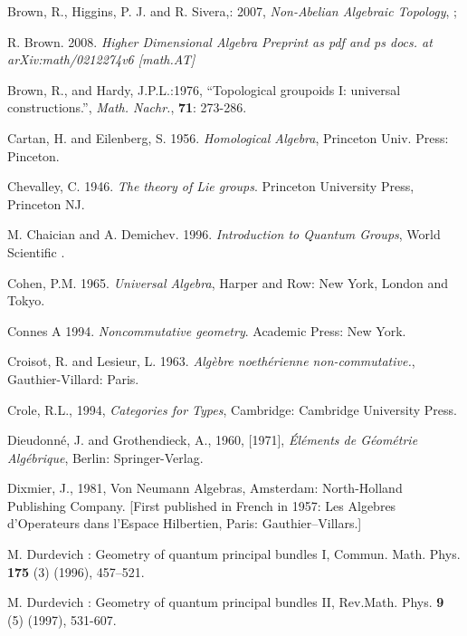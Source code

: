 \documentclass[12pt]{article}
\theoremstyle{plain}
\theoremstyle{definition}
\numberwithin{equation}{section}
\begin{document}
\begin{thebibliography}{199}

Brown, R., Higgins, P. J. and R. Sivera,: 2007, \emph{Non-Abelian Algebraic Topology}, 
;

R. Brown. 2008. {\em Higher Dimensional Algebra Preprint as pdf and ps docs. at arXiv:math/0212274v6 [math.AT]}

Brown, R., and Hardy, J.P.L.:1976, ``Topological groupoids I: universal constructions.'', \emph{Math. Nachr.}, \textbf{71}: 273-286.

Cartan, H. and Eilenberg, S. 1956. {\em Homological Algebra}, Princeton Univ. Press: Pinceton.

Chevalley, C. 1946. {\em The theory of Lie groups}. Princeton University Press, Princeton NJ.

M. Chaician and A. Demichev. 1996. {\em Introduction to Quantum Groups}, World Scientific .

Cohen, P.M. 1965. {\em Universal Algebra}, Harper and Row: New York, London and Tokyo.

Connes A 1994. \emph{Noncommutative geometry}. Academic Press: New York.

Croisot, R. and Lesieur, L. 1963. \emph{Alg\`ebre noeth\'erienne non-commutative.},
Gauthier-Villard: Paris.

Crole, R.L., 1994, {\em Categories for Types}, Cambridge: Cambridge University Press.  

Dieudonn\'e, J. and Grothendieck, A., 1960, [1971], {\em \'El\'ements de G\'eom\'etrie Alg\'ebrique}, Berlin: Springer-Verlag.  

Dixmier, J., 1981, Von Neumann Algebras, Amsterdam: North-Holland Publishing Company. [First published in French in 1957: Les Algebres d'Operateurs dans l'Espace Hilbertien, Paris: Gauthier--Villars.]

M. Durdevich : Geometry of quantum principal bundles I, Commun. Math. Phys. \textbf{175} (3) (1996), 457--521.

M. Durdevich : Geometry of quantum principal bundles II, Rev.Math. Phys. \textbf{9} (5) (1997), 531-607.


\end{thebibliography}
\end{document}
